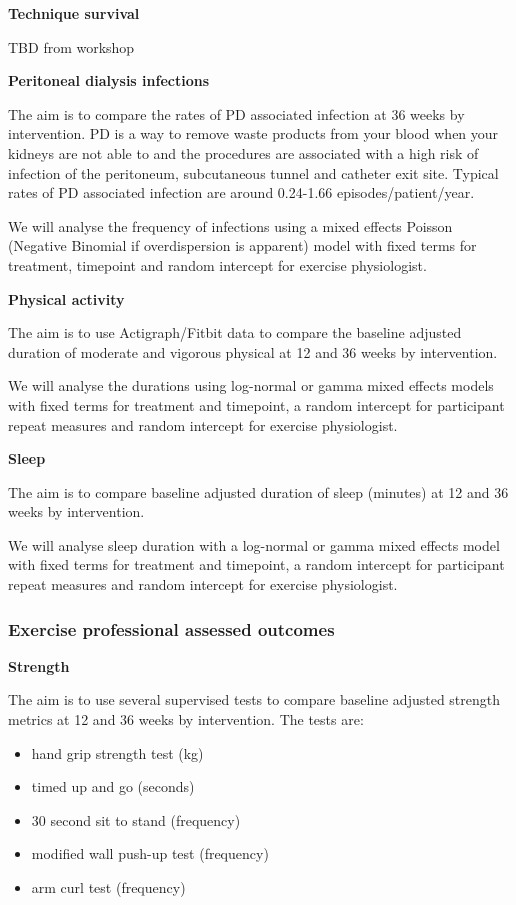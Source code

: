 \documentclass[
]{article}
\begin{document}
\textbf{Technique survival}

TBD from workshop

\textbf{Peritoneal dialysis infections}

The aim is to compare the rates of PD associated infection at 36 weeks by intervention.
PD is a way to remove waste products from your blood when your kidneys are not able to and the procedures are associated with a high risk of infection of the peritoneum, subcutaneous tunnel and catheter exit site.
Typical rates of PD associated infection are around 0.24-1.66 episodes/patient/year.

We will analyse the frequency of infections using a mixed effects Poisson (Negative Binomial if overdispersion is apparent) model with fixed terms for treatment, timepoint and random intercept for exercise physiologist.

\textbf{Physical activity}

The aim is to use Actigraph/Fitbit data to compare the baseline adjusted duration of moderate and vigorous physical at 12 and 36 weeks by intervention.

We will analyse the durations using log-normal or gamma mixed effects models with fixed terms for treatment and timepoint, a random intercept for participant repeat measures and random intercept for exercise physiologist.

\textbf{Sleep}

The aim is to compare baseline adjusted duration of sleep (minutes) at 12 and 36 weeks by intervention.

We will analyse sleep duration with a log-normal or gamma mixed effects model with fixed terms for treatment and timepoint, a random intercept for participant repeat measures and random intercept for exercise physiologist.


\hypertarget{exercise-professional-assessed-outcomes}{%
  \subsubsection{Exercise professional assessed outcomes}\label{exercise-professional-assessed-outcomes}}



\textbf{Strength}

The aim is to use several supervised tests to compare baseline adjusted strength metrics at 12 and 36 weeks by intervention.
The tests are:

\begin{itemize}
  \item hand grip strength test (kg)
  \item timed up and go (seconds)
  \item 30 second sit to stand (frequency)
  \item modified wall push-up test (frequency)
  \item arm curl test (frequency)

\end{itemize}
\end{document}
